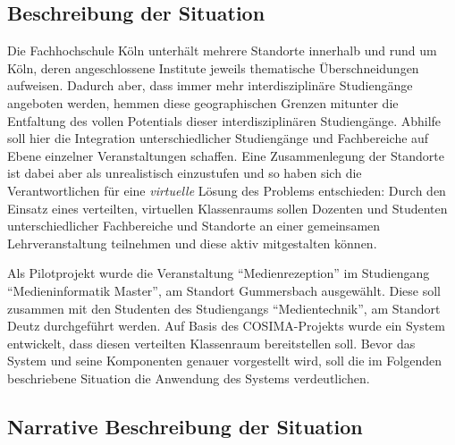 
\subsection{Beschreibung der Situation} %
\label{sub:beschreibung_des_szenario}

  Die Fachhochschule Köln unterhält mehrere Standorte innerhalb und rund um Köln, deren angeschlossene Institute jeweils thematische Überschneidungen aufweisen. Dadurch aber, dass immer mehr interdisziplinäre Studiengänge angeboten werden, hemmen diese geographischen Grenzen mitunter die Entfaltung des vollen Potentials dieser interdisziplinären Studiengänge. Abhilfe soll hier die Integration unterschiedlicher Studiengänge und Fachbereiche auf Ebene einzelner Veranstaltungen schaffen. Eine Zusammenlegung der Standorte ist dabei aber als unrealistisch einzustufen und so haben sich die Verantwortlichen für eine \emph{virtuelle} Lösung des Problems entschieden: Durch den Einsatz eines verteilten, virtuellen Klassenraums sollen Dozenten und Studenten unterschiedlicher Fachbereiche und Standorte an einer gemeinsamen Lehrveranstaltung teilnehmen und diese aktiv mitgestalten können.

  Als Pilotprojekt wurde die Veranstaltung "`Medienrezeption"' im Studiengang "`Medieninformatik Master"', am Standort Gummersbach ausgewählt. Diese soll zusammen mit den Studenten des Studiengangs "`Medientechnik"', am Standort Deutz durchgeführt werden. Auf Basis des COSIMA-Projekts wurde ein System entwickelt, dass diesen verteilten Klassenraum bereitstellen soll. Bevor das System und seine Komponenten genauer vorgestellt wird, soll die im Folgenden beschriebene Situation die Anwendung des Systems verdeutlichen.
  

\subsection{Narrative Beschreibung der Situation} %
\label{sub:ablaufbeschreibung}

